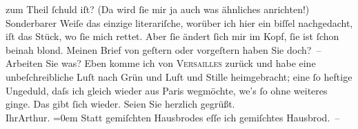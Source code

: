\begin{ledgroupsized}[t]{13cm}
                    zum Theil ſchuld iſt? (Da wird ſie mir ja auch was ähnliches anrichten!)
                    Sonderbarer Weiſe das einzige literariſche, worüber ich hier ein biſſel
                    nachgedacht, iſt das Stück,
                    wo  ſie mich {\pb}rettet. Aber ſie ändert ſich mir im Kopf, ſie ist ſchon beinah blond.\pend
           \pstart
           Meinen Brief von geſtern oder vorgeſtern haben Sie doch? –\pend
           \pstart
           Arbeiten Sie was?\pend
           \pstart
           Eben komme ich von \textsc{Versailles} zurück und habe eine unbeſchreibliche Luſt nach Grün und Luft und Stille
                        heimge{\pb}bracht; eine ſo heftige Ungeduld, daſs ich
                    gleich wieder aus Paris wegmöchte, we{\geminationn}’s ſo ohne
                    weiteres ginge.\pend
           \pstart
           Das gibt ſich wieder.\pend
           \pstart
           Seien Sie herzlich gegrüßt.{\\[\baselineskip]}Ihr\spacefill\mbox{Arthur.}\pend
           \leftskip=0em{}\pstart
           \noindent{}Statt gemiſchten Hausbrodes eſſe ich gemiſchtes Hausbrod. –\pend
           
         
         \endnumbering{}\end{ledgroupsized}  \newcommand{\dateiname}{L00672}\newcommand{\titel}{Arthur Schnitzler an Hugo von Hofmannsthal, 28. 4. 1897}\newcommand{\editorInnen}{Martin Anton Müller und Gerd-Hermann Susen}
      